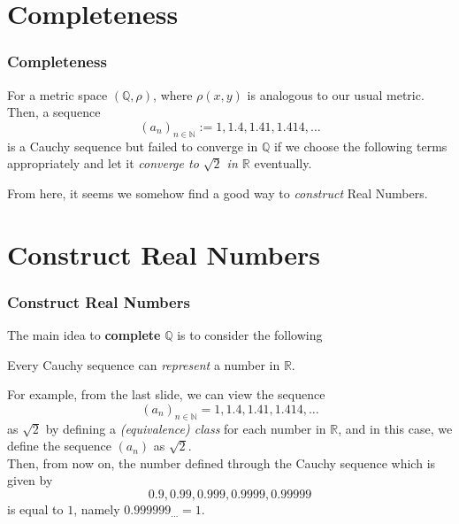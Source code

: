 \documentclass[12pt, t]{beamer}
\renewcommand{\emph}[1]{{\color{Turquoise3}\textsl{#1}}}
\begin{document}
\section{Completeness}
\begin{frame}
    \frametitle{Completeness}
For a metric space $(\mathbb{Q},\rho)$, where $\rho(x,y)$ is analogous to our usual metric. Then, a sequence
\begin{equation*}
    (a_n)_{n\in\mathbb{N}}:=1,1.4,1.41,1.414,\dots
\end{equation*}
is a Cauchy sequence but failed to converge in $\mathbb{Q}$ if we choose the following terms appropriately and let it \emph{converge 
to $\sqrt{2}$ in $\mathbb{R}$} eventually.\\
\vspace{0,5em}

From here, it seems we somehow find a good way to \emph{construct} Real Numbers.
\end{frame}

\section{Construct Real Numbers}
\begin{frame}
    \frametitle{Construct Real Numbers}
The main idea to \textbf{complete} $\mathbb{Q}$ is to consider the following\\
\begin{center}
    Every Cauchy sequence can \emph{represent} a number in $\mathbb{R}$.
\end{center}

For example, from the last slide, we can view the sequence 
\begin{equation*}
    (a_n)_{n\in\mathbb{N}}=1,1.4,1.41,1.414,\dots
\end{equation*}
as $\sqrt{2}$ by defining a \emph{(equivalence) class} for each number in $\mathbb{R}$, and in this case, we define the sequence $(a_n)$ as $\sqrt{2}$.\\
\vspace{0.5em}
Then, from now on, the number defined through the Cauchy sequence which is given by
\begin{equation*}
    0.9,0.99,0.999,0.9999,0.99999
\end{equation*}
is equal to $1$, namely $0.999999_{\dots}=1$.
\end{frame}
\end{document}
